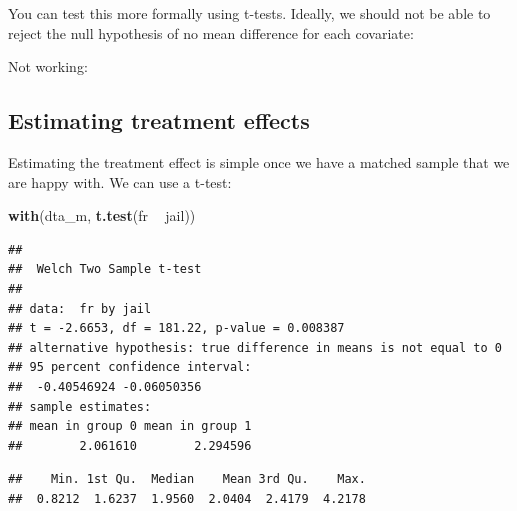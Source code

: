 \documentclass[]{article}
\newenvironment{Shaded}{\begin{snugshade}}{\end{snugshade}}
\newcommand{\ControlFlowTok}[1]{\textcolor[rgb]{0.13,0.29,0.53}{\textbf{#1}}}
\newcommand{\KeywordTok}[1]{\textcolor[rgb]{0.13,0.29,0.53}{\textbf{#1}}}
\newcommand{\NormalTok}[1]{#1}
\newcommand{\OperatorTok}[1]{\textcolor[rgb]{0.81,0.36,0.00}{\textbf{#1}}}
\newcommand{\StringTok}[1]{\textcolor[rgb]{0.31,0.60,0.02}{#1}}
\begin{document}
You can test this more formally using t-tests. Ideally, we should not be able to reject the null hypothesis of no mean difference for each covariate:

Not working:

\begin{Shaded}
\end{Shaded}

\hypertarget{estimating-treatment-effects}{%
\subsection{Estimating treatment effects}\label{estimating-treatment-effects}}

Estimating the treatment effect is simple once we have a matched sample that we are happy with. We can use a t-test:

\begin{Shaded}
\begin{Highlighting}[]
\KeywordTok{with}\NormalTok{(dta_m, }\KeywordTok{t.test}\NormalTok{(fr }\OperatorTok{~}\StringTok{ }\NormalTok{jail))}
\end{Highlighting}
\end{Shaded}

\begin{verbatim}
## 
##  Welch Two Sample t-test
## 
## data:  fr by jail
## t = -2.6653, df = 181.22, p-value = 0.008387
## alternative hypothesis: true difference in means is not equal to 0
## 95 percent confidence interval:
##  -0.40546924 -0.06050356
## sample estimates:
## mean in group 0 mean in group 1 
##        2.061610        2.294596
\end{verbatim}

\begin{Shaded}
\end{Shaded}

\begin{verbatim}
##    Min. 1st Qu.  Median    Mean 3rd Qu.    Max. 
##  0.8212  1.6237  1.9560  2.0404  2.4179  4.2178
\end{verbatim}
\end{document}
